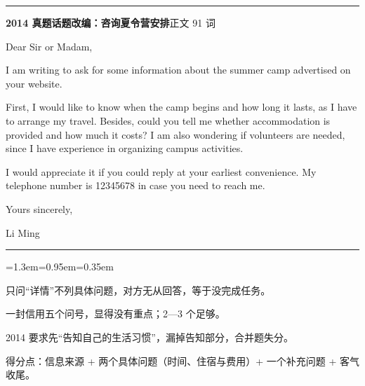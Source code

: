 \documentclass[10pt,a4paper]{ctexart}
\begin{document}
{\color{rule}\rule{\linewidth}{0.6pt}}\par\nopagebreak
\vspace{1pt}
\vspace{2pt}\noindent\colorbox{soft}{\parbox{\dimexpr\linewidth-2\fboxsep\relax}{%
\vspace{2pt}
{\footnotesize\bfseries\color{accent}2014 真题话题改编：咨询夏令营安排}\hfill{\footnotesize\color{gray}正文 91 词}
\par\vspace{2pt}
\footnotesize Dear Sir or Madam,\par
\footnotesize I am writing to ask for some information about the summer camp advertised on your website.\par
\footnotesize First, I would like to know when the camp begins and how long it lasts, as I have to arrange my travel. Besides, could you tell me whether accommodation is provided and how much it costs? I am also wondering if volunteers are needed, since I have experience in organizing campus activities.\par
\footnotesize I would appreciate it if you could reply at your earliest convenience. My telephone number is 12345678 in case you need to reach me.\par
\footnotesize Yours sincerely,\par
\footnotesize Li Ming\par
\par{}
\par\vspace{1pt}}}\par
\vspace{2pt}
\vspace{4pt}\par\nopagebreak
{\color{rule}\rule{\linewidth}{0.6pt}}\par\nopagebreak
\vspace{1pt}
\vspace{1pt}\begingroup\setlength{\parindent}{0pt}
\begin{list}{}{\leftmargin=1.3em=0.95em=0.35em\itemindent=0pt\topsep=0pt\partopsep=0pt\parsep=1.5pt\itemsep=0pt}
\item[{\color{warn}\scriptsize$\blacksquare$}]{\footnotesize 只问“详情”不列具体问题，对方无从回答，等于没完成任务。}
\item[{\color{warn}\scriptsize$\blacksquare$}]{\footnotesize 一封信用五个问号，显得没有重点；2—3 个足够。}
\item[{\color{warn}\scriptsize$\blacksquare$}]{\footnotesize 2014 要求先“告知自己的生活习惯”，漏掉告知部分，合并题失分。}
\item[{\color{warn}\scriptsize$\blacksquare$}]{\footnotesize 得分点：信息来源 + 两个具体问题（时间、住宿与费用）+ 一个补充问题 + 客气收尾。}
\end{list}
\end{document}

